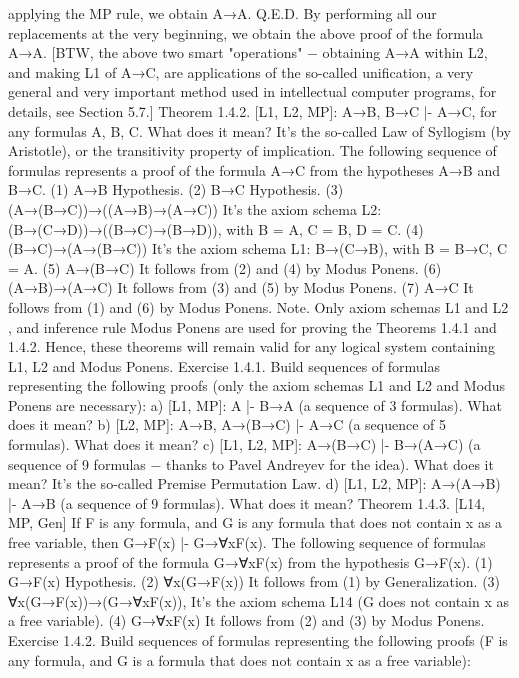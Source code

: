 applying the MP rule, we obtain A→A. Q.E.D. By performing all our replacements at the very beginning, we obtain the above
proof of the formula A→A. [BTW, the above two smart "operations" − obtaining A→A within L2, and making L1 of A→C,
are applications of the so-called unification, a very general and very important method used in intellectual computer programs,
for details, see Section 5.7.]
Theorem 1.4.2. [L1, L2, MP]: A→B, B→C |- A→C, for any formulas A, B, C. What does it mean? It's
the so-called Law of Syllogism (by Aristotle), or the transitivity property of implication.
The following sequence of formulas represents a proof of the formula A→C from the hypotheses A→B
and B→C.
(1) A→B
Hypothesis.
(2) B→C Hypothesis.
(3) (A→(B→C))→((A→B)→(A→C)) It's the axiom schema L2:
                                       (B→(C→D))→((B→C)→(B→D)), with B =
                                                  A, C = B, D = C.
(4) (B→C)→(A→(B→C)) It's the axiom schema L1: B→(C→B), with B
                               = B→C, C = A.
(5) A→(B→C) It follows from (2) and (4) by Modus Ponens.
(6) (A→B)→(A→C) It follows from (3) and (5) by Modus Ponens.
(7) A→C It follows from (1) and (6) by Modus Ponens.
Note. Only axiom schemas L1 and L2 , and inference rule Modus Ponens are used for proving the
Theorems 1.4.1 and 1.4.2. Hence, these theorems will remain valid for any logical system containing
L1, L2 and Modus Ponens.
Exercise 1.4.1. Build sequences of formulas representing the following proofs (only the axiom schemas
L1 and L2 and Modus Ponens are necessary):
a) [L1, MP]: A |- B→A (a sequence of 3 formulas). What does it mean?
b) [L2, MP]: A→B, A→(B→C) |- A→C (a sequence of 5 formulas). What does it mean?
c) [L1, L2, MP]: A→(B→C) |- B→(A→C) (a sequence of 9 formulas − thanks to Pavel Andreyev for the
idea). What does it mean? It's the so-called Premise Permutation Law.
d) [L1, L2, MP]: A→(A→B) |- A→B (a sequence of 9 formulas). What does it mean?
Theorem 1.4.3. [L14, MP, Gen] If F is any formula, and G is any formula that does not contain x as a free
variable, then
G→F(x) |- G→∀xF(x).
The following sequence of formulas represents a proof of the formula G→∀xF(x) from the hypothesis
G→F(x).
(1) G→F(x) Hypothesis.
(2) ∀x(G→F(x)) It follows from (1) by Generalization.
(3) ∀x(G→F(x))→(G→∀xF(x)), It's the axiom schema L14 (G does not
                                    contain x as a free variable).
(4) G→∀xF(x) It follows from (2) and (3) by Modus Ponens.
Exercise 1.4.2. Build sequences of formulas representing the following proofs (F is any formula, and G is
a formula that does not contain x as a free variable):
